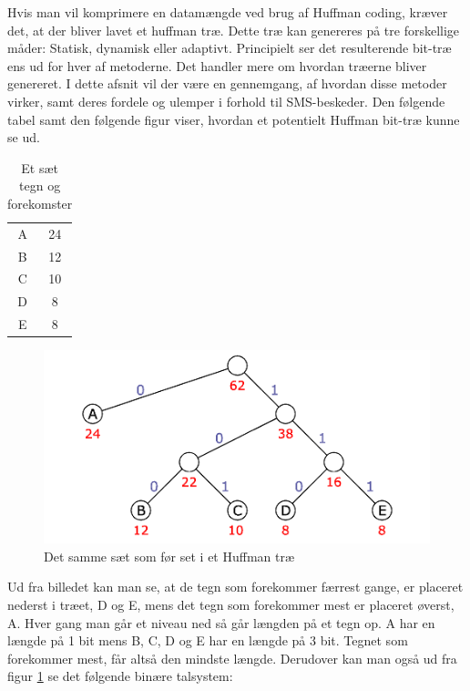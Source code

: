 Hvis man vil komprimere en datamængde ved brug af Huffman coding, kræver det, at der bliver lavet et huffman træ. Dette træ kan genereres på tre forskellige måder: Statisk, dynamisk eller adaptivt. Principielt ser det resulterende bit-træ ens ud for hver af metoderne. Det handler mere om hvordan træerne bliver genereret. I dette afsnit vil der være en gennemgang, af hvordan disse metoder virker, samt deres fordele og ulemper i forhold til SMS-beskeder. Den følgende tabel samt den følgende figur viser, hvordan et potentielt Huffman bit-træ kunne se ud.

\begin{table}[H]
\begin{center}
\begin{tabular}{|c|c|}
\hline
\cellcolor{ForestGreen}\color{white}{\textbf{Tegn}}& \cellcolor{ForestGreen}\color{white}{\textbf{Forekomster}}\\[2ex] \hline
A & 24 \\ \hline
B & 12 \\ \hline
C & 10 \\ \hline
D & 8 \\ \hline
E & 8 \\ \hline
\end{tabular} 
\caption{Et sæt tegn og forekomster}
\end{center}
\end{table}

\begin{figure}[H]
\centering
\includegraphics[width=0.75\linewidth]{Billeder/huffman_tree.png}
\caption{Det samme sæt som før set i et Huffman træ \cite{Hufftree_1}}
\label{fig:huffmantree_fred}
\end{figure}

Ud fra billedet kan man se, at de tegn som forekommer færrest gange, er placeret nederst i træet, D og E, mens det tegn som forekommer mest er placeret øverst, A. Hver gang man går et niveau ned så går længden på et tegn op. A har en længde på 1 bit mens B, C, D og E har en længde på 3 bit. Tegnet som forekommer mest, får altså den mindste længde. Derudover kan man også ud fra figur \ref{fig:huffmantree_fred} se det følgende binære talsystem:


